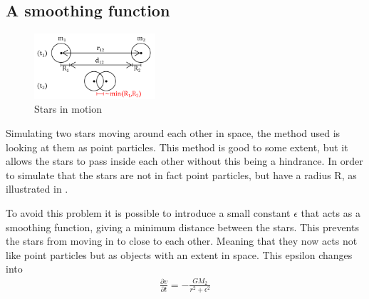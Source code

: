 \subsection{A smoothing function}
\label{sec:argumentforepsilon}
\begin{figure}
\begin{center}
\includegraphics[width = 0.4\textwidth]{Figures/argument_for_epsilon.png}
\end{center}
\caption{Stars in motion}
\label{fig:afeps}
\end{figure}

Simulating two stars moving around each other in space, the method used is looking at them as point particles. This method is good to some extent, but it allows the stars to pass inside each other without this being a hindrance. In order to simulate that the stars are not in fact point particles, but have a radius R, as illustrated in .  

To avoid this problem it is possible to introduce a small constant $\epsilon$ that acts as a smoothing function, giving a minimum distance between the stars. This prevents the stars from moving in to close to each other. Meaning that they now acts not like point particles but as objects with an extent in space. This epsilon changes  into 
\begin{align}
 \frac{\partial v}{\partial t} = -\frac{GM_2}{r^2 + \epsilon^2}
 \label{eq:SmoothingFct}
\end{align}




